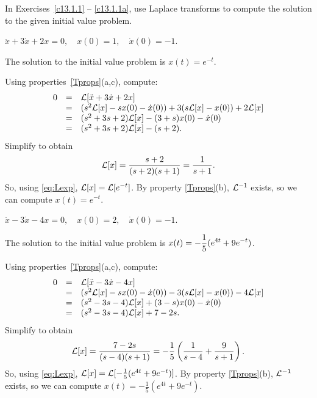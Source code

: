 \documentclass{ximera}
\begin{document}
\noindent In Exercises~\ref{c13.1.1} -- \ref{c13.1.1a}, use Laplace transforms 
to compute the solution to the given initial value problem.
\begin{exercise} \label{c13.1.1}
$\ddot{x} + 3\dot{x} + 2x = 0, \quad x(0) = 1, \quad \dot{x}(0) = -1$. 

\begin{solution}
\ans The solution to the initial value problem is
$x(t) = e^{-t}$.

\soln Using properties~\eqref{Tprops}(a,c), compute:
\[
\begin{array}{rcl}
0 & = & {\cal L}[\ddot{x} + 3\dot{x} + 2x] \\
& = & (s^2{\cal L}[x] - sx(0) - \dot{x}(0)) + 3(s{\cal L}[x] - x(0))
+ 2{\cal L}[x] \\
& = & (s^2 + 3s + 2){\cal L}[x] - (3 + s)x(0) - \dot{x}(0) \\
& = & (s^2 + 3s + 2){\cal L}[x] - (s + 2).
\end{array}
\]
Simplify to obtain
\[
{\cal L}[x] = \frac{s + 2}{(s + 2)(s + 1)} = \frac{1}{s + 1}.
\]
So, using \eqref{eq:Lexp},
${\cal L}[x] = {\cal L}[e^{-t}]$.  By property \eqref{Tprops}(b),
${\cal L}^{-1}$ exists, so we can compute $x(t) = e^{-t}$.

\end{solution}
\end{exercise}
\begin{exercise} \label{c13.1.1a}
$\ddot{x} - 3\dot{x} - 4x = 0, \quad x(0) = 2, \quad \dot{x}(0) = -1$. 

\begin{solution}
\ans The solution to the initial value problem is
$\displaystyle x(t) = -\frac{1}{5}(e^{4t}+9e^{-t})$.

\soln Using properties~\eqref{Tprops}(a,c), compute:
\[
\begin{array}{rcl}
0 & = & {\cal L}[\ddot{x} - 3\dot{x} - 4x] \\
& = & (s^2{\cal L}[x] - sx(0) - \dot{x}(0)) - 3(s{\cal L}[x] - x(0))
- 4{\cal L}[x] \\
& = & (s^2 - 3s - 4){\cal L}[x] + (3 - s)x(0) - \dot{x}(0) \\
& = & (s^2 - 3s - 4){\cal L}[x] + 7 - 2s.
\end{array}
\]
Simplify to obtain
\[
{\cal L}[x] = \frac{7-2s}{(s-4)(s+1)} = 
-\frac{1}{5}\left(\frac{1}{s-4} + \frac{9}{s+1}\right).
\]
So, using \eqref{eq:Lexp},
${\cal L}[x] = {\cal L}[-\frac{1}{5}(e^{4t}+9e^{-t})]$.  By property 
\eqref{Tprops}(b), ${\cal L}^{-1}$ exists, so we can compute 
$x(t) = -\frac{1}{5}(e^{4t}+9e^{-t})$.



\end{solution}
\end{exercise}
\end{document}

